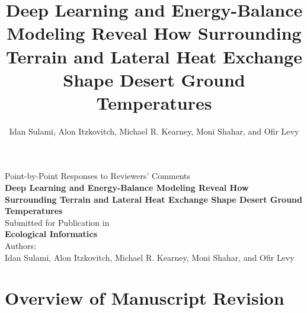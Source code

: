 \documentclass[12pt,english]{reviewresponse}
\title{Deep Learning and Energy-Balance Modeling Reveal How Surrounding Terrain and Lateral Heat Exchange Shape Desert Ground Temperatures}
\author{Idan Sulami, Alon Itzkovitch, Michael R. Kearney, Moni Shahar, and Ofir Levy}
\begin{document}
\begin{titlepage}
\begin{center}
    \vspace*{1cm}
    \large{Point-by-Point Responses to Reviewers' Comments}\\
    \vspace{0.5cm}
    \textbf{\LARGE{Deep Learning and Energy-Balance Modeling Reveal How Surrounding Terrain and Lateral Heat Exchange Shape Desert Ground Temperatures}}\\
    \vspace{1cm}
    \large{Submitted for Publication in}\\
    \Large{\textbf{Ecological Informatics}}\\
    \vspace{1cm}
    \large{Authors:}\\
    \large{Idan Sulami, Alon Itzkovitch, Michael R. Kearney, Moni Shahar, and Ofir Levy}
\end{center}
\end{titlepage}

\clearpage

\section*{Overview of Manuscript Revision}
\end{document}
